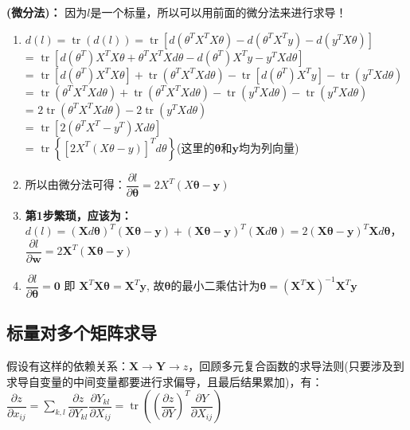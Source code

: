 \documentclass[UTF8]{article}
\begin{document}
    \textbf{(微分法)：} 因为$l$是一个标量，所以可以用前面的微分法来进行求导！
    \begin{enumerate}
        \item $d(l) = \operatorname{tr}(d(l))= \operatorname{tr}\left[d(\theta^T X^T X \theta)-d(\theta^T X^T y)- d(y^T X \theta)\right]$
        \\
        = $\operatorname{tr}\left[d(\theta^T) X^T X\theta + \theta^T X^T Xd\theta -d(\theta^T)X^T y - y^TXd\theta \right]$
        \\
        = $\operatorname{tr}[d(\theta^T) X^T X\theta] + \operatorname{tr}(\theta^T X^T Xd\theta) - \operatorname{tr}[d(\theta^T)X^T y] -\operatorname{tr}(y^TXd\theta)$
        \\
        = $\operatorname{tr}(\theta^T X^T X d\theta) + \operatorname{tr}(\theta^T X^T Xd\theta) - \operatorname{tr}(y^TXd\theta) -\operatorname{tr}(y^TXd\theta)$
        \\
        = $2\operatorname{tr}(\theta^T X^T X d\theta) - 2\operatorname{tr}(y^TXd\theta)$
        \\
        = $\operatorname{tr}[2 (\theta^T X^T - y^T)X d\theta]$
        \\
        = $\operatorname{tr}\left\{[2 X^T (X \theta - y)]^T d\theta\right\}$(这里的$\bm{\theta}$和$\bm{y}$均为列向量)
        \item 所以由微分法可得：$\dfrac{\partial l}{\partial \bm{\theta}}=2 X^{T}(X \boldsymbol{\theta}-\bm{y})$
        \item \textbf{第1步繁琐，应该为：}$d(l)=(\bm{X} d \bm{\theta})^{T}(\bm{X} \bm{\theta}-\bm{y})+(\bm{X} \bm{\theta}-\bm{y})^{T}(\bm{X} d \bm{\theta})=2(\bm{X} \bm{\theta}-\bm{y})^{T} \bm{X} d \bm{\theta}$，$\dfrac{\partial l}{\partial \bm{w}}=2 \bm{X}^{T}(\bm{X} \bm{\theta}-\boldsymbol{y})$
        \item $\dfrac{\partial l}{\partial \boldsymbol{\theta}}=\mathbf{0}$ 即 $\bm{X}^{T} \bm{X} \boldsymbol{\theta}=\bm{X}^{T} \boldsymbol{y}$, 故$\bm{\theta}$的最小二乘估计为$\boldsymbol{\theta}=\left(\bm{X}^{T} \bm{X}\right)^{-1} \bm{X}^{T} \boldsymbol{y}$
    \end{enumerate}

    \subsection{标量对多个矩阵求导}
    假设有这样的依赖关系：$\mathbf{X} \rightarrow \mathbf{Y} \rightarrow z$，回顾多元复合函数的求导法则(只要涉及到求导自变量的中间变量都要进行求偏导，且最后结果累加)，有：
    \\
    $\dfrac{\partial z}{\partial x_{i j}}=\sum_{k, l} \dfrac{\partial z}{\partial Y_{k l}} \dfrac{\partial Y_{k l}}{\partial X_{i j}}=\operatorname{tr}\left(\left(\dfrac{\partial z}{\partial Y}\right)^{T} \dfrac{\partial Y}{\partial X_{i j}}\right)$
\end{document}
